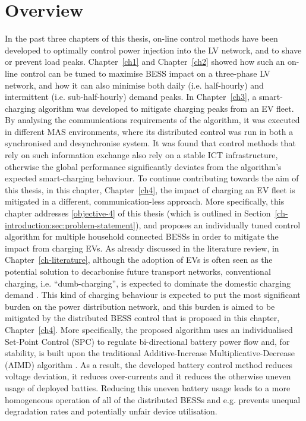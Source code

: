 \section{Overview}
\label{ch4:sec:overview}

In the past three chapters of this thesis, on-line control methods have been developed to optimally control power injection into the LV network, and to shave or prevent load peaks.
Chapter~\ref{ch1} and Chapter~\ref{ch2} showed how such an on-line control can be tuned to maximise BESS impact on a three-phase LV network, and how it can also minimise both daily (i.e. half-hourly) and intermittent (i.e. sub-half-hourly) demand peaks.
In Chapter~\ref{ch3}, a smart-charging algorithm was developed to mitigate charging peaks from an EV fleet.
By analysing the communications requirements of the algorithm, it was executed in different MAS environments, where its distributed control was run in both a synchronised and desynchronise system.
It was found that control methods that rely on such information exchange also rely on a stable ICT infrastructure, otherwise the global performance significantly deviates from the algorithm's expected smart-charging behaviour.
To continue contributing towards the aim of this thesis, in this chapter, Chapter~\ref{ch4}, the impact of charging an EV fleet is mitigated in a different, communication-less approach.
More specifically, this chapter addresses \ref{objective-4} of this thesis (which is outlined in Section~\ref{ch-introduction:sec:problem-statement}), and proposes an individually tuned control algorithm for multiple household connected BESSs in order to mitigate the impact from charging EVs.
As already discussed in the literature review, in Chapter~\ref{ch-literature}, although the adoption of EVs is often seen as the potential solution to decarbonise future transport networks, conventional charging, i.e. ``dumb-charging'', is expected to dominate the domestic charging demand \cite{Shah2015}.
This kind of charging behaviour is expected to put the most significant burden on the power distribution network, and this burden is aimed to be mitigated by the distributed BESS control that is proposed in this chapter, Chapter~\ref{ch4}.
More specifically, the proposed algorithm uses an individualised Set-Point Control (SPC) to regulate bi-directional battery power flow and, for stability, is built upon the traditional Additive-Increase Multiplicative-Decrease (AIMD) algorithm \cite{Chiu1989}.
As a result, the developed battery control method reduces voltage deviation, it reduces over-currents and it reduces the otherwise uneven usage of deployed batties.
Reducing this uneven battery usage leads to a more homogeneous operation of all of the distributed BESSs and e.g. prevents unequal degradation rates and potentially unfair device utilisation.

